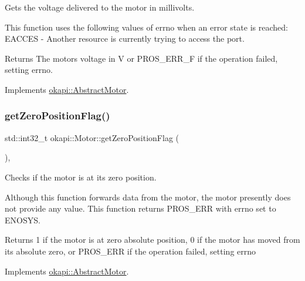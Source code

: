 Gets the voltage delivered to the motor in millivolts.

This function uses the following values of errno when an error state is reached\+: E\+A\+C\+C\+ES -\/ Another resource is currently trying to access the port.

\begin{DoxyReturn}{Returns}
The motor\textquotesingle{}s voltage in V or P\+R\+O\+S\+\_\+\+E\+R\+R\+\_\+F if the operation failed, setting errno. 
\end{DoxyReturn}


Implements \mbox{\hyperlink{classokapi_1_1AbstractMotor_a855b35b508e90074f21662b06ad2a0c8}{okapi\+::\+Abstract\+Motor}}.

\mbox{\label{classokapi_1_1Motor_a2640dea57e59a19aa6000da2c7cefdeb}} 
\subsubsection{\texorpdfstring{getZeroPositionFlag()}{getZeroPositionFlag()}}
{\footnotesize\ttfamily std\+::int32\+\_\+t okapi\+::\+Motor\+::get\+Zero\+Position\+Flag (\begin{DoxyParamCaption}{ }\end{DoxyParamCaption})\hspace{0.3cm}{\ttfamily [override]}, {\ttfamily [virtual]}}

Checks if the motor is at its zero position.

Although this function forwards data from the motor, the motor presently does not provide any value. This function returns P\+R\+O\+S\+\_\+\+E\+RR with errno set to E\+N\+O\+S\+YS.

\begin{DoxyReturn}{Returns}
1 if the motor is at zero absolute position, 0 if the motor has moved from its absolute zero, or P\+R\+O\+S\+\_\+\+E\+RR if the operation failed, setting errno 
\end{DoxyReturn}


Implements \mbox{\hyperlink{classokapi_1_1AbstractMotor_a07079ee87a07b98b7008f2ce91c645ea}{okapi\+::\+Abstract\+Motor}}.

\mbox{\label{classokapi_1_1Motor_aff882cb26c477355551d7bbf8e5c03bb}} 
